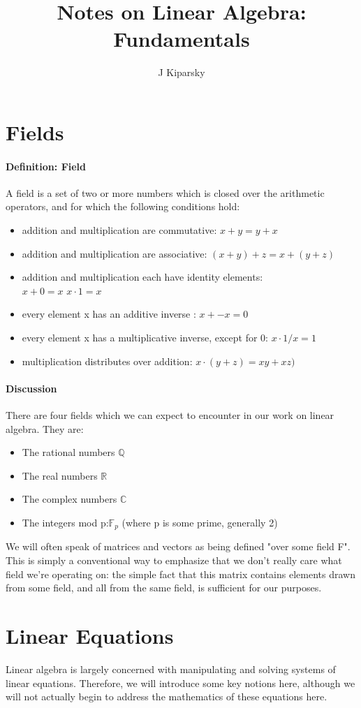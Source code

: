 \documentclass[12pt,letterpaper,final]{article}
\author{J Kiparsky}
\title{Notes on Linear Algebra: Fundamentals}
\begin{document}
\section{Fields}
\paragraph{Definition: Field} A field is a set of two or more numbers which is closed over the arithmetic operators, and for which the following conditions hold:
\begin{itemize}
\item addition and multiplication are commutative: $x+y = y+x$
\item addition and multiplication are associative: $(x+y) +z = x+(y+z)$
\item addition and multiplication each have identity elements: \\$x +0=x$ $x \cdot 1 = x$
\item every element x has an additive inverse : $x + -x = 0$
\item every element x has a multiplicative inverse, except for 0: $x \cdot 1/x = 1$
\item multiplication distributes over addition: $x \cdot (y+z) = xy + xz)$
\end{itemize}

\paragraph{Discussion}There are four fields which we can expect to encounter in our work on linear algebra. They are:
\begin{itemize}
\item The rational numbers $\mathbb{Q}$
\item The real numbers $\mathbb{R}$
\item The complex numbers $\mathbb{C}$
\item The integers mod p:$\mathbb{F}_{p}$ (where p is some prime, generally 2)
\end{itemize}

We will often speak of matrices and vectors as being defined "over some field F". This is simply a conventional way to emphasize that we don't really care what field we're operating on: the simple fact that this matrix contains elements drawn from some field, and all from the same field, is sufficient for our purposes. 

\section{Linear Equations}
Linear algebra is largely concerned with manipulating and solving systems of linear equations. Therefore, we will introduce some key notions here, although we will not actually begin to address the mathematics of these equations here. 
\end{document}
